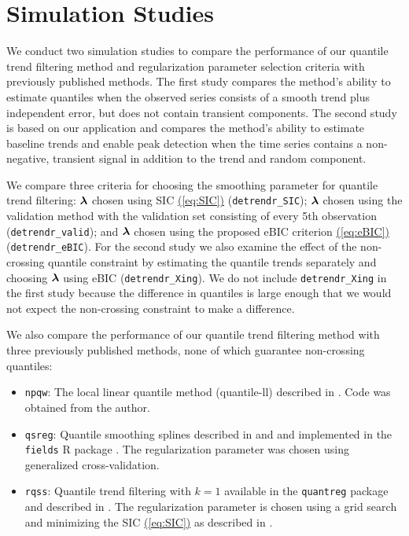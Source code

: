 \documentclass[aoas]{imsart}
\newcommand{\Eqn}[1]{\hyperref[eq:#1]{{\rm (\ref*{eq:#1})}}} %
\newcommand{\Eqn}[1]{{(\ref{eq:#1})}} %
\newcommand{\V}[1]{{\bm{\mathbf{\MakeLowercase{#1}}}}} %
\begin{document}
\section{Simulation Studies}
\label{sec:simluation}

We conduct two simulation studies to compare the performance of our quantile trend filtering method and regularization parameter selection criteria with previously published methods. The first study compares the method's ability to estimate quantiles when the observed series consists of a smooth trend plus independent error, but does not contain transient components. The second study is based on our application and compares the method's ability to estimate baseline trends and enable peak detection when the time series contains a non-negative, transient signal in addition to the trend and random component.

We compare three criteria for choosing the smoothing parameter for quantile trend filtering:  $\V{\lambda}$ chosen using SIC \Eqn{SIC} (\texttt{detrendr\_SIC}); $\V{\lambda}$ chosen using the validation method with the validation set consisting of every 5th observation (\texttt{detrendr\_valid}); and $\V{\lambda}$ chosen using the proposed eBIC criterion \Eqn{eBIC} (\texttt{detrendr\_eBIC}). For the second study we also examine the effect of the non-crossing quantile constraint by estimating the quantile trends separately and choosing $\V{\lambda}$ using eBIC (\texttt{detrendr\_Xing}). We do not include \texttt{detrendr\_Xing} in the first study because the difference in quantiles is large enough that we would not expect the non-crossing constraint to make a difference. 

We also compare the performance of our quantile trend filtering method with three previously published methods, none of which guarantee non-crossing quantiles: 

\begin{itemize}
	\item \texttt{npqw}: The local linear quantile method (quantile-ll) described in \cite{Racine2017}. Code was obtained from the author.
	\item \texttt{qsreg}: Quantile smoothing splines described in \cite{Oh2004period} and \cite{nychka1995nonparametric} and implemented in the \texttt{fields} R package \citep{fields}. The regularization parameter was chosen using generalized cross-validation.
	\item \texttt{rqss}: Quantile trend filtering with $k=1$ available in the \texttt{quantreg} package and described in \cite{KoenkerNgPortnoy1994}. The regularization parameter is chosen using a grid search and minimizing the SIC \Eqn{SIC} as described in \cite{KoenkerNgPortnoy1994}.
\end{itemize}   
\end{document}

